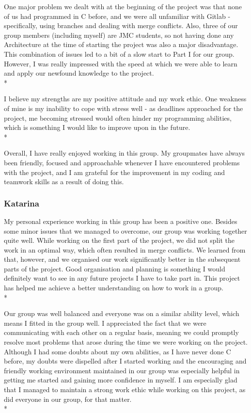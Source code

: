 \documentclass[letterpaper,11pt]{article}
\begin{document}
    \noindent One major problem we dealt with at the beginning of the project was that none of us had programmed in C before, and we were all unfamiliar with Gitlab - specifically, using branches and dealing with merge conflicts. Also, three of our group members (including myself) are JMC students, so not having done any Architecture at the time of starting the project was also a major disadvantage. This combination of issues led to a bit of a slow start to Part I for our group. However, I was really impressed with the speed at which we were able to learn and apply our newfound knowledge to the project.\\*

    \noindent I believe my strengths are my positive attitude and my work ethic. One weakness of mine is my inability to cope with stress well - as deadlines approached for the project, me becoming stressed would often hinder my programming abilities, which is something I would like to improve upon in the future. \\*

    \noindent Overall, I have really enjoyed working in this group. My groupmates have always been friendly, focused and approachable whenever I have encountered problems with the project, and I am grateful for the improvement in my coding and teamwork skills as a result of doing this.

    \subsubsection{Katarina}
    My personal experience working in this group has been a positive one. Besides some minor issues that we managed to overcome, our group was working together quite well. While working on the first part of the project, we did not split the work in an optimal way, which often resulted in merge conflicts. We learned from that, however, and we organised our work significantly better in the subsequent parts of the project. Good organisation and planning is something I would definitely want to see in any future projects I have to take part in. This project has helped me achieve a better understanding on how to work in a group.\\*

    \noindent Our group was well balanced and everyone was on a similar ability level, which means I fitted in the group well. I appreciated the fact that we were communicating with each other on a regular basis, meaning we could promptly resolve most problems that arose during the time we were working on the project. Although I had some doubts about my own abilities, as I have never done C before, my doubts were dispelled after I started working and the encouraging and friendly working environment maintained in our group was especially helpful in getting me started and gaining more confidence in myself. I am especially glad that I managed to maintain a strong work ethic while working on this project, as did everyone in our group, for that matter.\\*
\end{document}
